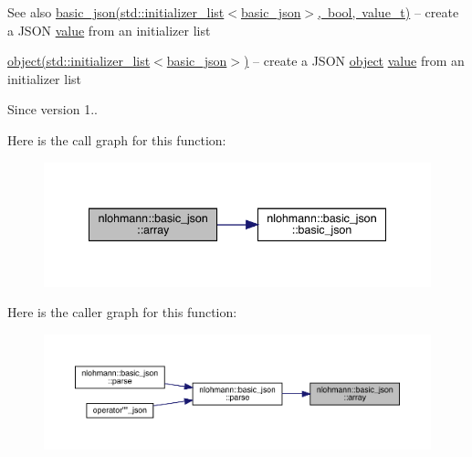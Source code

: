 \begin{DoxySeeAlso}{See also}
\mbox{\hyperlink{classnlohmann_1_1basic__json_afbad48316e7cd37366ba3ac5d7e5859e}{basic\+\_\+json(std\+::initializer\+\_\+list$<$basic\+\_\+json$>$, bool, value\+\_\+t)}} -- create a J\+S\+ON \mbox{\hyperlink{classnlohmann_1_1basic__json_af9c51328fbe1da75eca750be3009917a}{value}} from an initializer list 

\mbox{\hyperlink{classnlohmann_1_1basic__json_a9f42ee7d10eee2d5a73fd94ca7f767ca}{object(std\+::initializer\+\_\+list$<$basic\+\_\+json$>$)}} -- create a J\+S\+ON \mbox{\hyperlink{classnlohmann_1_1basic__json_a9f42ee7d10eee2d5a73fd94ca7f767ca}{object}} \mbox{\hyperlink{classnlohmann_1_1basic__json_af9c51328fbe1da75eca750be3009917a}{value}} from an initializer list
\end{DoxySeeAlso}
\begin{DoxySince}{Since}
version 1.. 
\end{DoxySince}
Here is the call graph for this function\+:\nopagebreak
\begin{figure}[H]
\begin{center}
\leavevmode
\includegraphics[width=341pt]{classnlohmann_1_1basic__json_a4a4ec75e4d2845d9bcf7a9e5458e4949_cgraph}
\end{center}
\end{figure}
Here is the caller graph for this function\+:\nopagebreak
\begin{figure}[H]
\begin{center}
\leavevmode
\includegraphics[width=350pt]{classnlohmann_1_1basic__json_a4a4ec75e4d2845d9bcf7a9e5458e4949_icgraph}
\end{center}
\end{figure}
\mbox{\label{classnlohmann_1_1basic__json_a73ae333487310e3302135189ce8ff5d8}} 
